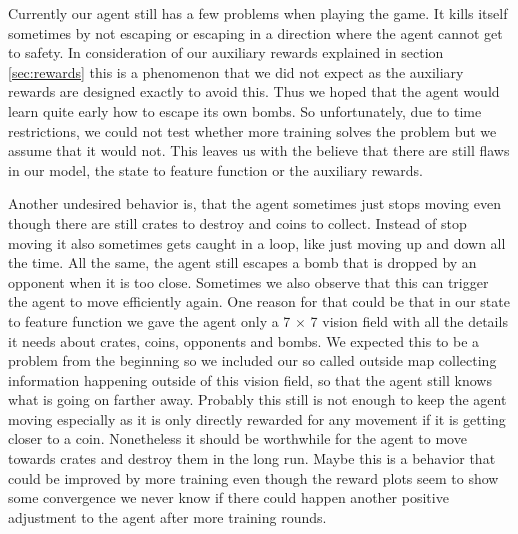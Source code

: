 Currently our agent still has a few problems when playing the game. It kills itself sometimes by not escaping or escaping in a direction where the agent cannot get to safety. In consideration of our auxiliary rewards explained in section \ref{sec:rewards} this is a phenomenon that we did not expect as the auxiliary rewards are designed exactly to avoid this. Thus we hoped that the agent would learn quite early how to escape its own bombs. So unfortunately, due to time restrictions, we could not test whether more training solves the problem but we assume that it would not. This leaves us with the believe that there are still flaws in our model, the state to feature function or the auxiliary rewards. 

Another undesired behavior is, that the agent sometimes just stops moving even though there are still crates to destroy and coins to collect. Instead of stop moving it also sometimes gets caught in a loop, like just moving up and down all the time. All the same, the agent still escapes a bomb that is dropped by an opponent when it is too close. Sometimes we also observe that this can trigger the agent to move efficiently again. One reason for that could be that in our state to feature function we gave the agent only a 7 $\times$ 7 vision field with all the details it needs about crates, coins, opponents and bombs. We expected this to be a problem from the beginning so we included our so called outside map collecting information happening outside of this vision field, so that the agent still knows what is going on farther away. Probably this still is not enough to keep the agent moving especially as it is only directly rewarded for any movement if it is getting closer to a coin. Nonetheless it should be worthwhile for the agent to move towards crates and destroy them in the long run. Maybe this is a behavior that could be improved by more training even though the reward plots seem to show some convergence we never know if there could happen another positive adjustment to the agent after more training rounds.
